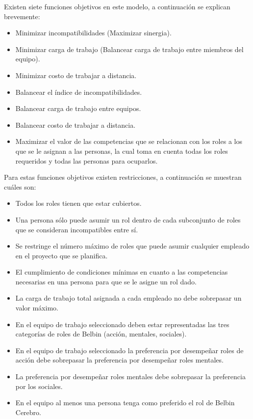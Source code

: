 Existen siete funciones objetivos en este modelo, a continuación se explican brevemente:
\begin{itemize}
	\item Minimizar incompatibilidades (Maximizar sinergia).
	\item Minimizar carga de trabajo (Balancear carga de trabajo entre miembros del equipo).
	\item Minimizar costo de trabajar a distancia.
	\item Balancear el índice de incompatibilidades.
	\item Balancear carga de trabajo entre equipos.
	\item Balancear costo de trabajar a distancia.
	\item Maximizar el valor de las competencias que se relacionan con los roles a los que se le asignan a las personas, la cual toma en cuenta todas los roles requeridos y todas las personas para ocuparlos.
\end{itemize}

Para estas funciones objetivos existen restricciones, a continuación se muestran cuáles son:
\begin{itemize}
	\item Todos los roles tienen que estar cubiertos.
	\item Una persona sólo puede asumir un rol dentro de cada subconjunto de roles que se consideran incompatibles entre sí.
	\item Se restringe el número máximo de roles que puede asumir cualquier empleado en el proyecto que se planifica.
	\item El cumplimiento de condiciones mínimas en cuanto a las competencias necesarias
	en una persona para que se le asigne un rol dado.
	\item La carga de trabajo total asignada a cada empleado no debe sobrepasar un valor
	máximo.
	\item En el equipo de trabajo seleccionado deben estar representadas las tres
	categorías de roles de Belbin (acción, mentales, sociales).
	\item En el equipo de trabajo seleccionado la preferencia por desempeñar roles de acción debe sobrepasar la preferencia por desempeñar roles mentales.
	\item La preferencia por desempeñar roles mentales debe	sobrepasar la preferencia por los sociales.
	\item En el equipo al menos una persona tenga como preferido el rol de Belbin Cerebro.
\end{itemize}

